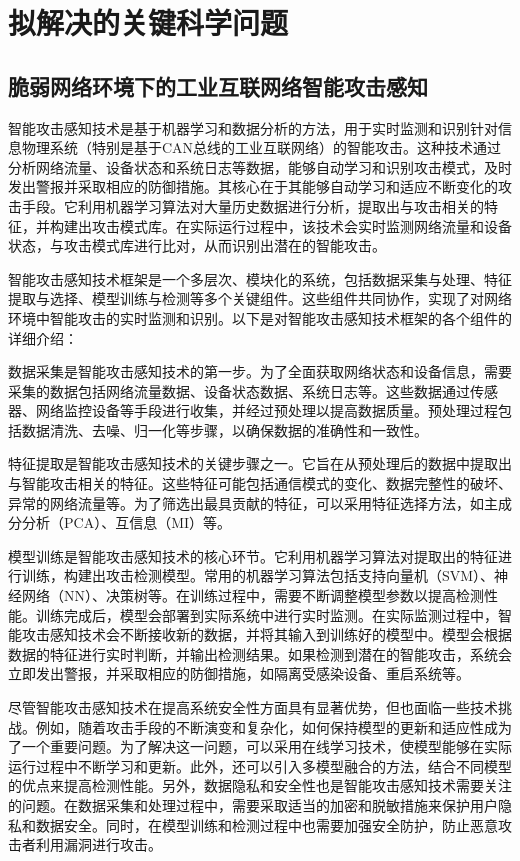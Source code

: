 \section{拟解决的关键科学问题}

\subsection{脆弱网络环境下的工业互联网络智能攻击感知}

智能攻击感知技术是基于机器学习和数据分析的方法，用于实时监测和识别针对信息物理系统（特别是基于CAN总线的工业互联网络）的智能攻击。这种技术通过分析网络流量、设备状态和系统日志等数据，能够自动学习和识别攻击模式，及时发出警报并采取相应的防御措施。其核心在于其能够自动学习和适应不断变化的攻击手段。它利用机器学习算法对大量历史数据进行分析，提取出与攻击相关的特征，并构建出攻击模式库。在实际运行过程中，该技术会实时监测网络流量和设备状态，与攻击模式库进行比对，从而识别出潜在的智能攻击。

智能攻击感知技术框架是一个多层次、模块化的系统，包括数据采集与处理、特征提取与选择、模型训练与检测等多个关键组件。这些组件共同协作，实现了对网络环境中智能攻击的实时监测和识别。以下是对智能攻击感知技术框架的各个组件的详细介绍：

数据采集是智能攻击感知技术的第一步。为了全面获取网络状态和设备信息，需要采集的数据包括网络流量数据、设备状态数据、系统日志等。这些数据通过传感器、网络监控设备等手段进行收集，并经过预处理以提高数据质量。预处理过程包括数据清洗、去噪、归一化等步骤，以确保数据的准确性和一致性。

特征提取是智能攻击感知技术的关键步骤之一。它旨在从预处理后的数据中提取出与智能攻击相关的特征。这些特征可能包括通信模式的变化、数据完整性的破坏、异常的网络流量等。为了筛选出最具贡献的特征，可以采用特征选择方法，如主成分分析（PCA）、互信息（MI）等。

模型训练是智能攻击感知技术的核心环节。它利用机器学习算法对提取出的特征进行训练，构建出攻击检测模型。常用的机器学习算法包括支持向量机（SVM）、神经网络（NN）、决策树等。在训练过程中，需要不断调整模型参数以提高检测性能。训练完成后，模型会部署到实际系统中进行实时监测。在实际监测过程中，智能攻击感知技术会不断接收新的数据，并将其输入到训练好的模型中。模型会根据数据的特征进行实时判断，并输出检测结果。如果检测到潜在的智能攻击，系统会立即发出警报，并采取相应的防御措施，如隔离受感染设备、重启系统等。

尽管智能攻击感知技术在提高系统安全性方面具有显著优势，但也面临一些技术挑战。例如，随着攻击手段的不断演变和复杂化，如何保持模型的更新和适应性成为了一个重要问题。为了解决这一问题，可以采用在线学习技术，使模型能够在实际运行过程中不断学习和更新。此外，还可以引入多模型融合的方法，结合不同模型的优点来提高检测性能。另外，数据隐私和安全性也是智能攻击感知技术需要关注的问题。在数据采集和处理过程中，需要采取适当的加密和脱敏措施来保护用户隐私和数据安全。同时，在模型训练和检测过程中也需要加强安全防护，防止恶意攻击者利用漏洞进行攻击。


